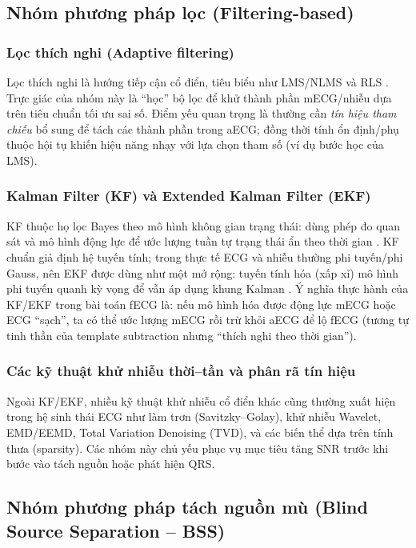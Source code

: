 \documentclass[../DoAn.tex]{subfiles}
\begin{document}
\subsection{Nhóm phương pháp lọc (Filtering-based)}
\subsubsection{Lọc thích nghi (Adaptive filtering)}
Lọc thích nghi là hướng tiếp cận cổ điển, tiêu biểu như LMS/NLMS và RLS \cite{fotiadouEnhancementLowqualityFetal2018}. Trực giác của nhóm này là “học” bộ lọc để khử thành phần mECG/nhiễu dựa trên tiêu chuẩn tối ưu sai số. Điểm yếu quan trọng là thường cần \textit{tín hiệu tham chiếu} bổ sung để tách các thành phần trong aECG; đồng thời tính ổn định/phụ thuộc hội tụ khiến hiệu năng nhạy với lựa chọn tham số (ví dụ bước học của LMS).

\subsubsection{Kalman Filter (KF) và Extended Kalman Filter (EKF)}
KF thuộc họ lọc Bayes theo mô hình không gian trạng thái: dùng phép đo quan sát và mô hình động lực để ước lượng tuần tự trạng thái ẩn theo thời gian \cite{suganthyEnhancementSNRFetal2019}. KF chuẩn giả định hệ tuyến tính; trong thực tế ECG và nhiễu thường phi tuyến/phi Gauss, nên EKF được dùng như một mở rộng: tuyến tính hóa (xấp xỉ) mô hình phi tuyến quanh kỳ vọng để vẫn áp dụng khung Kalman \cite{sarafanNovelECGDenoising2022}. Ý nghĩa thực hành của KF/EKF trong bài toán fECG là: nếu mô hình hóa được động lực mECG hoặc ECG “sạch”, ta có thể ước lượng mECG rồi trừ khỏi aECG để lộ fECG (tương tự tinh thần của template subtraction nhưng “thích nghi theo thời gian”).

\subsubsection{Các kỹ thuật khử nhiễu thời--tần và phân rã tín hiệu}
Ngoài KF/EKF, nhiều kỹ thuật khử nhiễu cổ điển khác cũng thường xuất hiện trong hệ sinh thái ECG như làm trơn (Savitzky--Golay), khử nhiễu Wavelet, EMD/EEMD, Total Variation Denoising (TVD), và các biến thể dựa trên tính thưa (sparsity). Các nhóm này chủ yếu phục vụ mục tiêu tăng SNR trước khi bước vào tách nguồn hoặc phát hiện QRS.

\subsection{Nhóm phương pháp tách nguồn mù (Blind Source Separation -- BSS)}
\end{document}
